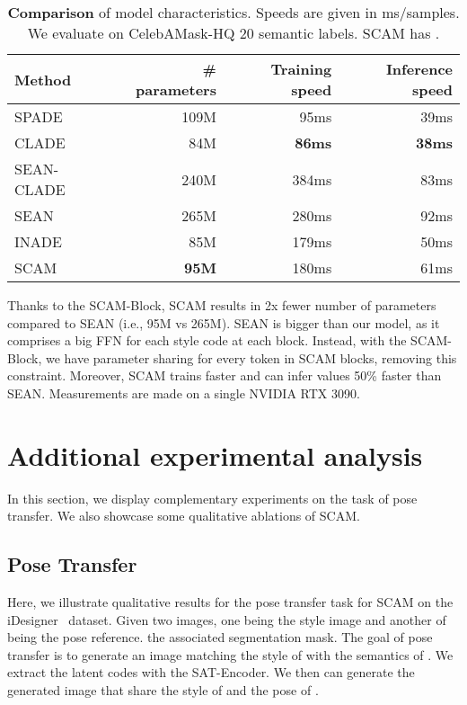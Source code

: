 \documentclass[runningheads]{llncs}
\makeatletter
\newcommand{\mname}{SCAM\@\xspace}
\makeatother
\begin{document}
\begin{table}[t]
\begin{center}
		\begin{small}
\begin{tabular}{lrrr}
\toprule
Method & \# parameters  & Training speed   & Inference speed  \\
\midrule
SPADE & 109M & 95ms & 39ms\\
CLADE & 84M & \textbf{86ms} & \textbf{38ms} \\
SEAN-CLADE & 240M & 384ms & 83ms \\
SEAN & 265M & 280ms & 92ms \\
INADE & 85M & 179ms & 50ms \\

\mname & \textbf{95M} & 180ms & 61ms \\
\bottomrule
\end{tabular}\end{small}
	\end{center}
	\caption{\small{\textbf{Comparison} of model characteristics. Speeds are given in ms/samples. We evaluate on CelebAMask-HQ\cite{karras2018progressive} 20 semantic labels. \mname has .}}
\label{tab:model_tech}
\end{table}


Thanks to the SCAM-Block, \mname results in 2x fewer number of parameters compared to SEAN (i.e., 95M vs 265M). SEAN is bigger than our model, as it comprises a big FFN for each style code at each block. Instead, with the \mname-Block, we have parameter sharing for every token in SCAM blocks, removing this constraint. Moreover, \mname trains faster and can infer values 50\% faster than SEAN. Measurements are made on a single NVIDIA RTX 3090.

\section{Additional experimental analysis}
\label{sup:sub:exps}

In this section, we display complementary experiments on the task of pose transfer. We also showcase some qualitative ablations of \mname.

\subsection{Pose Transfer}

Here, we illustrate qualitative results for the pose transfer task for \mname on the iDesigner~\cite{idesigner} dataset. 
Given two images, one being the style image  and another of  being the pose reference.  the associated segmentation mask. The goal of pose transfer is to generate an image matching the style of  with the semantics of . We extract the latent codes  with the SAT-Encoder. We then can generate  the generated image that share the style of  and the pose of .
\end{document}

